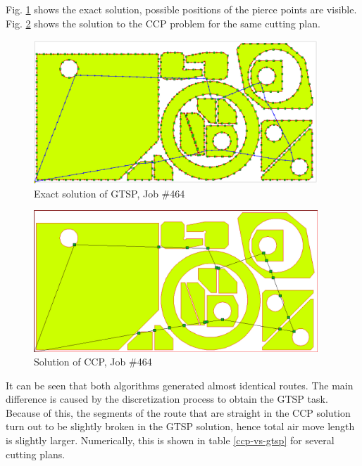 \documentclass[]{llncs}
\begin{document}
Fig. \ref{gtsp-path} shows the exact solution,
possible positions of the pierce points are visible.
Fig. \ref{ccp-path} shows the solution to the CCP problem
for the same cutting plan.

\begin{figure}
  \begin{center}
    \includegraphics[width=0.95\textwidth]{464-gtsp.png}
  \end{center}
  \caption{Exact solution of GTSP, Job \#464}
  \label{gtsp-path}
\end{figure}

\begin{figure}
  \begin{center}
    \includegraphics[width=0.95\textwidth]{464-ccp.png}
  \end{center}
  \caption{Solution of CCP, Job \#464}
  \label{ccp-path}
\end{figure}

It can be seen that both algorithms
generated almost identical routes.
The main difference is caused by the discretization process
to obtain the GTSP task.
Because of this,
the segments of the route that are straight in the CCP solution
turn out to be slightly broken in the GTSP solution,
hence total air move length is slightly larger.
Numerically, this is shown in table \ref{ccp-vs-gtsp}
for several cutting plans.
\end{document}
